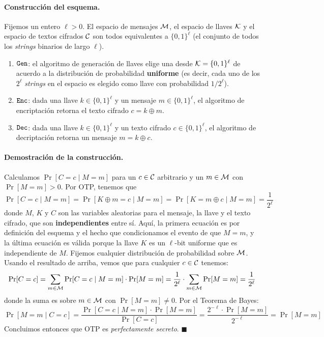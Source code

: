 \paragraph*{Construcción del esquema.} Fijemos un entero $\ell > 0$. El espacio de mensajes $\mathcal{M}$, el espacio de llaves $\mathcal{K}$ y el espacio de textos cifrados $\mathcal{C}$ son todos equivalentes a $\{0,1\}^\ell$ (el conjunto de todos los \textit{strings} binarios de largo $\ell$).
\begin{enumerate}
    \item $\texttt{Gen}$: el algoritmo de generación de llaves elige una desde $\mathcal{K} = \{0,1\}^\ell$ de acuerdo a la distribución de probabilidad \textbf{uniforme} (es decir, cada uno de los $2^\ell$ \textit{strings} en el espacio es elegido como llave con probabilidad $1/2^\ell$).
    \item $\texttt{Enc}$: dada una llave $k \in \{0,1\}^\ell$ y un mensaje $m \in \{0,1\}^\ell$, el algoritmo de encriptación retorna el texto cifrado $c = k \oplus m$.
    \item $\texttt{Dec}$: dada una llave $k \in \{0,1\}^\ell$ y un texto cifrado $c \in \{0,1\}^\ell$, el algoritmo de decriptación retorna un mensaje $m = k \oplus c$.
\end{enumerate}

\paragraph*{Demostración de la construcción.} Calculamos $\Pr[C = c \mid M = m]$ para un $c \in \mathcal{C}$ arbitrario y un $m \in \mathcal{M}$ con $\Pr[M = m] > 0$. Por OTP, tenemos que
$$
    \Pr[C = c \mid M = m] = \Pr[K \oplus m = c \mid M = m] = \Pr[K = m \oplus c \mid M = m] = \frac{1}{2^\ell}
$$
donde $M$, $K$ y $C$ son las variables aleatorias para el mensaje, la llave y el texto cifrado, que son \textbf{independientes} entre sí. Aquí, la primera ecuación es por definición del esquema y el hecho que condicionamos el evento de que $M = m$, y la última ecuación es válida porque la llave $K$ es un $\ell$-bit uniforme  que es independiente de $M$. Fijemos cualquier distribución de probabilidad sobre $\mathcal{M}$. Usando el resultado de arriba, vemos que para cualquier $c \in \mathcal{C}$ tenemos:
$$
    \Pr[C = c] = \sum_{m \in \mathcal{M}} \Pr[C = c \mid M = m]\cdot \Pr[M = m] = \frac{1}{2^\ell} \cdot \sum_{m \in \mathcal{M}} \Pr[M = m] = \frac{1}{2^\ell}
$$
donde la suma es sobre $m \in \mathcal{M}$ con $\Pr[M = m] \neq 0$. Por el Teorema de Bayes:
$$
    \Pr[M = m \mid C = c] = \frac{\Pr[C = c \mid M = m] \cdot \Pr[M = m]}{\Pr[C = c]} = \frac{2^{-\ell} \cdot \Pr[M = m]}{2^{-\ell}} = \Pr[M = m]
$$
Concluimos entonces que OTP es \textit{perfectamente secreto}. \hfill $\blacksquare$

